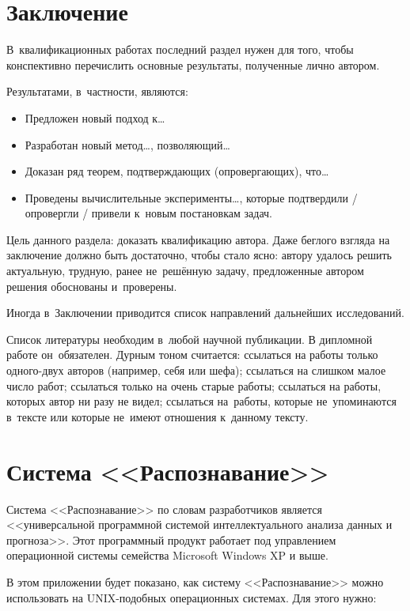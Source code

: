 \documentclass[12pt]{article}
\begin{document}
\section{Заключение}

В~квалификационных работах последний раздел нужен для того, чтобы
конспективно перечислить основные результаты, полученные лично
автором.

Результатами, в~частности, являются:
\begin{itemize}
\item
    Предложен новый подход к\dots
\item
    Разработан новый метод\dots, позволяющий\dots
\item
    Доказан ряд теорем, подтверждающих (опровергающих), что\dots
\item
    Проведены вычислительные эксперименты\dots, которые подтвердили /
    опровергли / привели к~новым постановкам задач.
\end{itemize}

Цель данного раздела: доказать квалификацию автора.  Даже беглого
взгляда на заключение должно быть достаточно, чтобы стало ясно: автору
удалось решить актуальную, трудную, ранее не~решённую задачу,
предложенные автором решения обоснованы и~проверены.

Иногда в~Заключении приводится список направлений дальнейших
исследований.

\newpage
Список литературы необходим в~любой научной публикации. В дипломной
работе он~обязателен. Дурным тоном считается: ссылаться на работы
только одного-двух авторов (например, себя или шефа); ссылаться на
слишком малое число работ; ссылаться только на очень старые работы;
ссылаться на работы, которых автор ни разу не видел; ссылаться
на~работы, которые не~упоминаются в~тексте или которые не~имеют
отношения к~данному тексту.

\appendix
\section{Система <<Распознавание>>}
Система <<Распознавание>> по словам разработчиков \cite{recognition06}
является <<универсальной программной системой интеллектуального
анализа данных и прогноза>>. Этот программный продукт работает под
управлением операционной системы семейства Microsoft Windows XP и
выше.

В этом приложении будет показано, как систему <<Распознавание>> можно
использовать на UNIX-подобных операционных системах. Для этого нужно:
\end{document}
